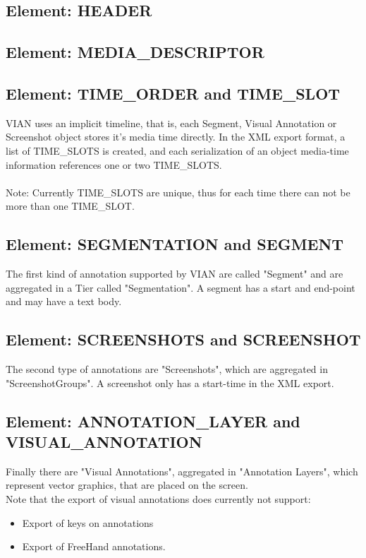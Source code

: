 \documentclass[11pt, a4paper,oneside,chapterprefix=false]{scrbook}
\begin{document}
\subsection{Element: HEADER}

\subsection{Element: MEDIA\_DESCRIPTOR}


\newpage
\subsection{Element: TIME\_ORDER and TIME\_SLOT}

VIAN uses an implicit timeline, that is, each Segment, Visual Annotation or Screenshot object stores it's media time directly. In the XML export format, a list of TIME\_SLOTS is created, and each serialization of an object media-time information references one or two TIME\_SLOTS. \\
\\
Note: Currently TIME\_SLOTS are unique, thus for each time there can not be more than one TIME\_SLOT.\\
\subsection{Element: SEGMENTATION and SEGMENT}

The first kind of annotation supported by VIAN are called "Segment" and are aggregated in a Tier called "Segmentation". A segment has a start and end-point and may have a text body. \\

\subsection{Element: SCREENSHOTS and SCREENSHOT}

The second type of annotations are "Screenshots", which are aggregated in "ScreenshotGroups". 
A screenshot only has a start-time in the XML export. 

\newpage
\subsection{Element: ANNOTATION\_LAYER and VISUAL\_ANNOTATION}
Finally there are "Visual Annotations", aggregated in "Annotation Layers", which represent vector graphics, that are placed on the screen. \\

Note that the export of visual annotations does currently not support: 
\begin{itemize}
	\item Export of keys on annotations
	\item Export of FreeHand annotations. 
\end{itemize}
\end{document}

